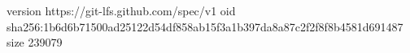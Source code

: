 version https://git-lfs.github.com/spec/v1
oid sha256:1b6d6b71500ad25122d54df858ab15f3a1b397da8a87c2f2f8f8b4581d691487
size 239079

